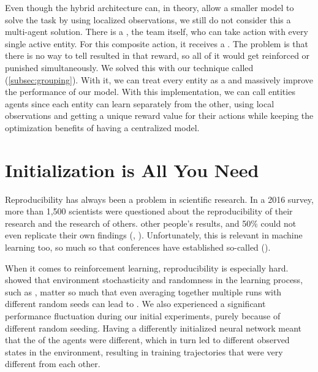 \bigskip

\noindent Even though the hybrid architecture can, in theory, allow a smaller model to solve the task by using localized observations, we still do not consider this a multi-agent solution. There is a , the team itself, who can take action with every single active entity. For this composite action, it receives a . The problem is that there is no way to tell  resulted in that reward, so all of it would get reinforced or punished simultaneously. We solved this with our technique called  (\autoref{subsec:grouping}). With it, we can treat every entity as a  and massively improve the performance of our model. With this implementation, we can call entities agents since each entity can learn separately from the other, using local observations and getting a unique reward value for their actions while keeping the optimization benefits of having a centralized model.


\section{Initialization is All You Need}
\label{ch:disc-init-is-all-you-need}

\noindent Reproducibility has always been a problem in scientific research. In a 2016 survey, more than 1,500 scientists were questioned about the reproducibility of their research and the research of others.  other people's results, and 50\% could not even replicate their own findings (\cite{karbasi2023replicability}, \cite{Baker2016}). Unfortunately, this  is relevant in machine learning too, so much so that conferences have established so-called  (\cite{pwc_rc_2022}).

\bigskip

\noindent When it comes to reinforcement learning, reproducibility is especially hard. \cite{henderson2019deep} showed that environment stochasticity and randomness in the learning process, such as , matter so much that even averaging together multiple runs with different random seeds can lead to . We also experienced a significant performance fluctuation during our initial experiments, purely because of different random seeding. Having a differently initialized neural network meant that the  of the agents were different, which in turn led to different observed states in the environment, resulting in training trajectories that were very different from each other.

